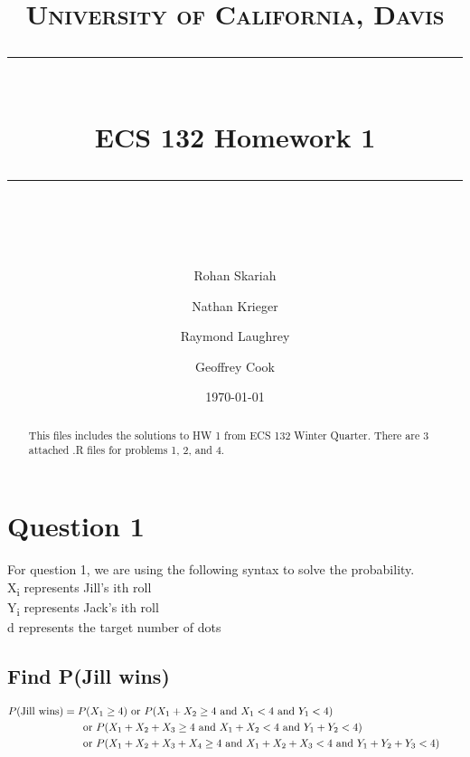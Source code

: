\documentclass{article}
\numberwithin{equation}{section}
\newcommand{\A}{\text{ and }}
\newcommand{\R}{\text{ or }}
\newcommand{\eqname}[1]{\tag*{#1}}%
\begin{document}
\title{	
	\normalfont\normalsize
	\textsc{University of California, Davis} \\ %
	\vspace{25pt} %
	\rule{\linewidth}{0.5pt} \\ %
	\vspace{20pt} %
	{\huge ECS 132 Homework 1} \\ %
	\vspace{12pt} %
	\rule{\linewidth}{2pt} \\ %
	\vspace{12pt} %
}

\author{Rohan Skariah \and Nathan Krieger \and Raymond Laughrey \and Geoffrey Cook}
\date{\normalsize\today}
\maketitle

\begin{abstract}
This files includes the solutions to HW 1 from ECS 132 Winter Quarter. There are 3 attached .R files for problems 1, 2, and 4.
\end{abstract}

\section{Question 1}

For question 1, we are using the following syntax to solve the probability.
\\ \indent 
X\textsubscript{i} represents Jill's ith roll
\\ \indent 
Y\textsubscript{i} represents Jack's ith roll
\\ \indent
d represents the target number of dots

\subsection{Find P(Jill wins)}

\begin{align} 
	    \label{P(Jill wins)}
		P\text{(Jill wins)} &= P(X_1 \geq 4) \R P(X_1 + X_2 \geq 4 \A X_1 < 4 \A Y_1 < 4) \eqname{} \\
		& \indent \R P(X_1 + X_2 + X_3 \geq 4 \A X_1 + X_2 < 4 \A Y_1 + Y_2 < 4) \eqname{} \\
		& \indent \R P(X_1 + X_2 + X_3 + X_4 \geq 4 \A X_1 + X_2 + X_3 < 4 \A Y_1 + Y_2 + Y_3 < 4) \eqname{} \\
\end{align}
\end{document}
